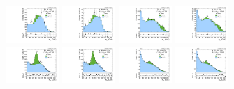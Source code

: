 \begin{figure}[htbp]
  \centering
  \includegraphics[width=0.18\textwidth]{fig/fitValidation/PostFit_SR_MJJ_MVV0700to1000__mu_HP_bb_LDy_Run2.pdf}
  \includegraphics[width=0.18\textwidth]{fig/fitValidation/PostFit_SR_MJJ_MVV0700to1000__e_HP_bb_LDy_Run2.pdf}
  \includegraphics[width=0.18\textwidth]{fig/fitValidation/PostFit_SR_MJJ_MVV0700to1000__mu_LP_bb_LDy_Run2.pdf}
  \includegraphics[width=0.18\textwidth]{fig/fitValidation/PostFit_SR_MJJ_MVV0700to1000__e_LP_bb_LDy_Run2.pdf}\\
  \includegraphics[width=0.18\textwidth]{fig/fitValidation/PostFit_SR_MJJ_MVV0700to1000__mu_HP_nobb_LDy_Run2.pdf}
  \includegraphics[width=0.18\textwidth]{fig/fitValidation/PostFit_SR_MJJ_MVV0700to1000__e_HP_nobb_LDy_Run2.pdf}
  \includegraphics[width=0.18\textwidth]{fig/fitValidation/PostFit_SR_MJJ_MVV0700to1000__mu_LP_nobb_LDy_Run2.pdf}
  \includegraphics[width=0.18\textwidth]{fig/fitValidation/PostFit_SR_MJJ_MVV0700to1000__e_LP_nobb_LDy_Run2.pdf}\\

\end{figure}
